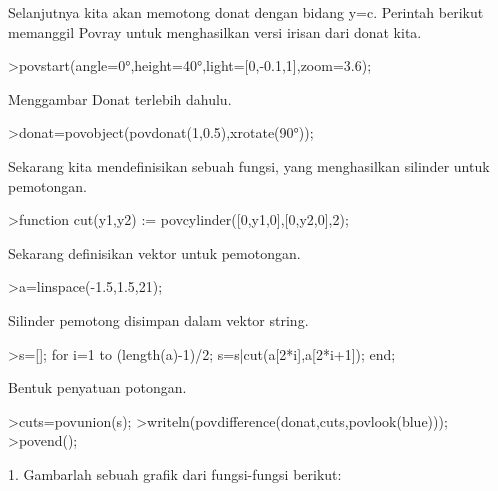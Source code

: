 \documentclass{article}
\begin{document}
\begin{eulernotebook}
\begin{eulercomment}
\begin{eulercomment}
\begin{eulercomment}
\begin{eulercomment}
\begin{eulercomment}
Selanjutnya kita akan memotong donat dengan bidang y=c. Perintah
berikut memanggil Povray untuk menghasilkan versi irisan dari donat
kita.
\end{eulercomment}
\begin{eulerprompt}
>povstart(angle=0°,height=40°,light=[0,-0.1,1],zoom=3.6);
\end{eulerprompt}
\begin{eulercomment}
Menggambar Donat terlebih dahulu.
\end{eulercomment}
\begin{eulerprompt}
>donat=povobject(povdonat(1,0.5),xrotate(90°));
\end{eulerprompt}
\begin{eulercomment}
Sekarang kita mendefinisikan sebuah fungsi, yang menghasilkan silinder
untuk pemotongan.
\end{eulercomment}
\begin{eulerprompt}
>function cut(y1,y2) := povcylinder([0,y1,0],[0,y2,0],2);
\end{eulerprompt}
\begin{eulercomment}
Sekarang definisikan vektor untuk pemotongan.
\end{eulercomment}
\begin{eulerprompt}
>a=linspace(-1.5,1.5,21);
\end{eulerprompt}
\begin{eulercomment}
Silinder pemotong disimpan dalam vektor string.
\end{eulercomment}
\begin{eulerprompt}
>s=[]; for i=1 to (length(a)-1)/2; s=s|cut(a[2*i],a[2*i+1]); end;
\end{eulerprompt}
\begin{eulercomment}
Bentuk penyatuan potongan.
\end{eulercomment}
\begin{eulerprompt}
>cuts=povunion(s);
>writeln(povdifference(donat,cuts,povlook(blue)));
>povend();
\end{eulerprompt}
\begin{eulercomment}
\begin{eulercomment}
\begin{eulercomment}
1. Gambarlah sebuah grafik dari fungsi-fungsi berikut:


\end{eulercomment}
\end{eulercomment}
\end{eulercomment}
\end{eulercomment}
\end{eulercomment}
\end{eulercomment}
\end{eulercomment}
\end{eulernotebook}
\end{document}
